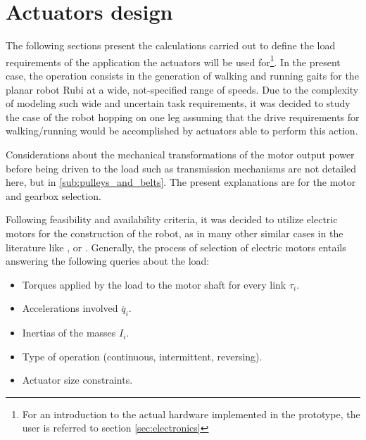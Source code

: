 
\section{Actuators design}
\label{sec_actuators}
The following sections present the calculations carried out to define the load requirements of the application the actuators will be used for\footnote{For an introduction to the actual hardware implemented in the prototype, the user is referred to section \ref{sec:electronics}}.
In the present case, the operation consists in the generation of walking and running gaits for the planar robot Rubi at a wide, not-specified range of speeds. 
Due to the complexity of modeling such wide and uncertain task requirements, it was decided to study the case of the robot hopping on one leg assuming that the drive requirements for walking/running would be accomplished by actuators able to perform this action.

Considerations about the mechanical transformations of the motor output power before being driven to the load such as transmission mechanisms are not detailed here, but in \ref{sub:pulleys_and_belts}.
The present explanations are for the motor and gearbox selection.

Following feasibility and availability criteria, it was decided to utilize electric motors for the construction of the robot, as in many other similar cases in the literature like \cite{runbot1}, \cite{phides} or \cite{biobiped}.
Generally, the process of selection of electric motors entails answering the following queries about the load:

\begin{itemize}
\label{list:motor_selection}
	\item Torques applied by the load to the motor shaft for every link $\tau_{i}$.
	\item Accelerations involved $\ddot{q_{i}}$.
	\item Inertias of the masses $I_{i}$.
	\item Type of operation (continuous, intermittent, reversing).
	\item Actuator size constraints.
\end{itemize}

